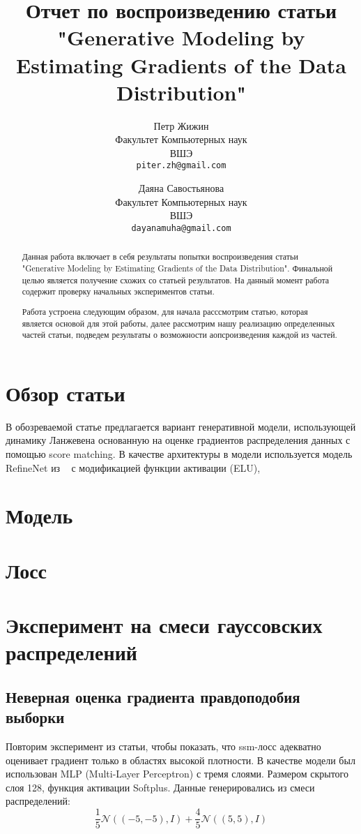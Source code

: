 \documentclass{article}
\title{Отчет по воспроизведению статьи "Generative Modeling by Estimating Gradients of the Data Distribution"}
\author{%
  Петр Жижин \\
  Факультет Компьютерных наук\\
  ВШЭ\\
  \texttt{piter.zh@gmail.com} \\
   \and
   Даяна Савостьянова \\
   Факультет Компьютерных наук\\
   ВШЭ\\
   \texttt{dayanamuha@gmail.com} \\
}
\begin{document}

\maketitle

\begin{abstract}
  Данная работа включает в себя результаты попытки воспроизведения статьи 
  "Generative Modeling by Estimating Gradients of the Data Distribution". Финальной целью является получение схожих со статьей результатов. На данный момент работа содержит проверку начальных экспериментов статьи.
  
  Работа устроена следующим образом, для начала расссмотрим статью, которая является основой для этой работы, далее рассмотрим нашу реализацию определенных частей статьи, подведем результаты о возможности аопсроизведения каждой из частей.
\end{abstract}


\section{Обзор статьи}

В обозреваемой статье предлагается вариант генеративной модели, использующей динамику Ланжевена основанную на оценке градиентов распределения данных с помощью score matching. В качестве архитектуры в модели используется модель RefineNet из ~\cite{DBLP:journals/corr/LinMS016} с модификацией функции активации (ELU), 

\section{Модель}

\section{Лосс}

\section{Эксперимент на смеси гауссовских распределений}

\subsection{Неверная оценка градиента правдоподобия выборки}
Повторим эксперимент из статьи, чтобы показать, что ssm-лосс адекватно
оценивает градиент только в областях высокой плотности. В качестве модели был
использован MLP (Multi-Layer Perceptron) с тремя слоями. Размером скрытого слоя
128, функция активации Softplus. Данные генерировались из смеси распределений:
\[
\frac{1}{5} \mathcal{N}\left( \left( -5, -5\right), I \right)+\frac{4}{5} \mathcal{N}\left( \left( 5, 5\right), I \right)
\]
\end{document}
